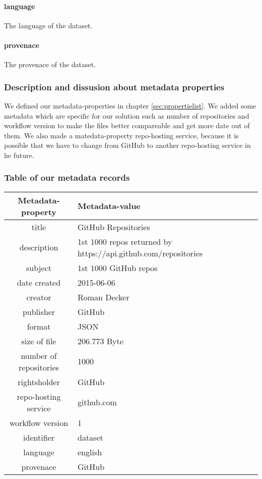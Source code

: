 \paragraph{language}
The language of the dataset.
\paragraph{provenace}
The provenace of the dataset.

\subsubsection{Description and dissusion about metadata
properties}\label{sec:descprop}

We defined our metadata-properties in chapter \ref{sec:propertielist}. We added
some metadata which are specific for our solution such as number of repositories
and workflow version to make the files better compareable and get more date out
of them. We also made a matedata-property repo-hosting service, because it is
possible that we have to change from GitHub to another repo-hosting service in
he future.


\subsubsection{Table of our metadata records}\label{sec:metadatarecordtable}

\begin{tabular}{ c | l}
    \textbf{Metadata-property} & \textbf{Metadata-value} \\
    \hline
    title & GitHub Repositories \\
    \hline
    description & 1st 1000 repos returned by https://api.github.com/repositories  \\
    \hline
    subject & 1st 1000 GitHub repos \\
    \hline
    date created & 2015-06-06 \\
    \hline
     creator & Roman Decker \\
    \hline
     publisher & GitHub \\
    \hline
     format & JSON \\
    \hline
     size of file & 206.773 Byte \\
    \hline
     number of repositories & 1000 \\
    \hline
     rightsholder & GitHub \\
    \hline
     repo-hosting service & github.com \\
    \hline
     workflow version & 1 \\
    \hline
     identifier & dataset \\
    \hline
     language & english \\
    \hline
     provenace & GitHub \\
    \hline
\end{tabular}
